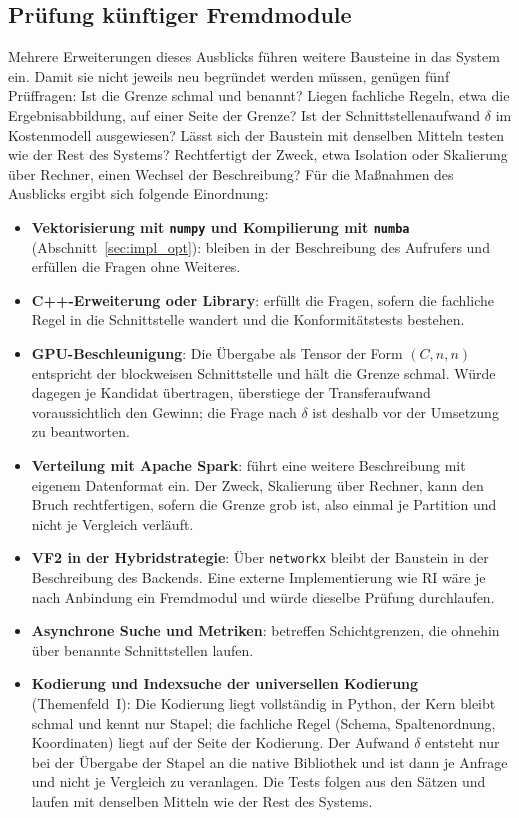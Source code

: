 \documentclass[a4paper,12pt, twoside]{report}
\theoremstyle{definition}
\begin{document}
\subsection{Prüfung künftiger Fremdmodule}
\label{sec:fremd_pruefung}

Mehrere Erweiterungen dieses Ausblicks führen weitere Bausteine in das System ein. Damit sie nicht jeweils neu begründet werden müssen, genügen fünf Prüffragen: Ist die Grenze schmal und benannt? Liegen fachliche Regeln, etwa die Ergebnisabbildung, auf einer Seite der Grenze? Ist der Schnittstellenaufwand $\delta$ im Kostenmodell ausgewiesen? Lässt sich der Baustein mit denselben Mitteln testen wie der Rest des Systems? Rechtfertigt der Zweck, etwa Isolation oder Skalierung über Rechner, einen Wechsel der Beschreibung? Für die Maßnahmen des Ausblicks ergibt sich folgende Einordnung:

\begin{itemize}
	\item \textbf{Vektorisierung mit \texttt{numpy} und Kompilierung mit \texttt{numba}} (Abschnitt~\ref{sec:impl_opt}): bleiben in der Beschreibung des Aufrufers und erfüllen die Fragen ohne Weiteres.
	\item \textbf{C++-Erweiterung oder Library}: erfüllt die Fragen, sofern die fachliche Regel in die Schnittstelle wandert und die Konformitätstests bestehen.
	\item \textbf{GPU-Beschleunigung}: Die Übergabe als Tensor der Form $(C,n,n)$ entspricht der blockweisen Schnittstelle und hält die Grenze schmal. Würde dagegen je Kandidat übertragen, überstiege der Transferaufwand voraussichtlich den Gewinn; die Frage nach $\delta$ ist deshalb vor der Umsetzung zu beantworten.
	\item \textbf{Verteilung mit Apache Spark}: führt eine weitere Beschreibung mit eigenem Datenformat ein. Der Zweck, Skalierung über Rechner, kann den Bruch rechtfertigen, sofern die Grenze grob ist, also einmal je Partition und nicht je Vergleich verläuft.
	\item \textbf{VF2 in der Hybridstrategie}: Über \texttt{networkx} bleibt der Baustein in der Beschreibung des Backends. Eine externe Implementierung wie RI \cite{bonnici2013} wäre je nach Anbindung ein Fremdmodul und würde dieselbe Prüfung durchlaufen.
	\item \textbf{Asynchrone Suche und Metriken}: betreffen Schichtgrenzen, die ohnehin über benannte Schnittstellen laufen.
	\item \textbf{Kodierung und Indexsuche der universellen Kodierung} (Themenfeld~I): Die Kodierung liegt vollständig in Python, der Kern bleibt schmal und kennt nur Stapel; die fachliche Regel (Schema, Spaltenordnung, Koordinaten) liegt auf der Seite der Kodierung. Der Aufwand $\delta$ entsteht nur bei der Übergabe der Stapel an die native Bibliothek und ist dann je Anfrage und nicht je Vergleich zu veranlagen. Die Tests folgen aus den Sätzen und laufen mit denselben Mitteln wie der Rest des Systems.
\end{itemize}
\end{document}
